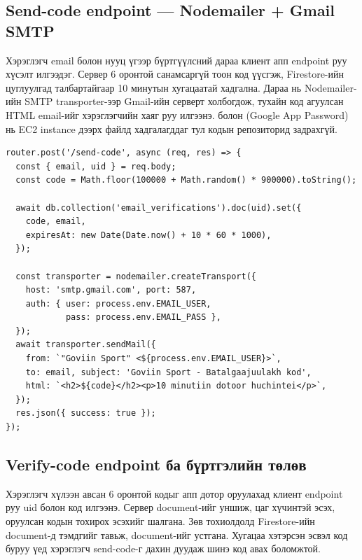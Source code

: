 \subsection*{Send-code endpoint --- Nodemailer + Gmail SMTP}

Хэрэглэгч email болон нууц үгээр бүртгүүлсний дараа клиент апп  endpoint руу хүсэлт илгээдэг. Сервер 6 оронтой санамсаргүй тоон код үүсгэж, Firestore-ийн  цуглуулгад  талбартайгаар 10 минутын хугацаатай хадгална. Дараа нь Nodemailer-ийн SMTP transporter-ээр Gmail-ийн  серверт холбогдож, тухайн код агуулсан HTML email-ийг хэрэглэгчийн хаяг руу илгээнэ.  болон  (Google App Password) нь EC2 instance дээрх  файлд хадгалагддаг тул кодын репозиторид задрахгүй.

\begin{lstlisting}[language={}, caption={routes/auth.js --- Nodemailer ашиглан баталгаажуулах код илгээх}]
router.post('/send-code', async (req, res) => {
  const { email, uid } = req.body;
  const code = Math.floor(100000 + Math.random() * 900000).toString();

  await db.collection('email_verifications').doc(uid).set({
    code, email,
    expiresAt: new Date(Date.now() + 10 * 60 * 1000),
  });

  const transporter = nodemailer.createTransport({
    host: 'smtp.gmail.com', port: 587,
    auth: { user: process.env.EMAIL_USER,
            pass: process.env.EMAIL_PASS },
  });
  await transporter.sendMail({
    from: `"Goviin Sport" <${process.env.EMAIL_USER}>`,
    to: email, subject: 'Goviin Sport - Batalgaajuulakh kod',
    html: `<h2>${code}</h2><p>10 minutiin dotoor huchintei</p>`,
  });
  res.json({ success: true });
});
\end{lstlisting}

\subsection*{Verify-code endpoint ба бүртгэлийн төлөв}

Хэрэглэгч хүлээн авсан 6 оронтой кодыг апп дотор оруулахад клиент  endpoint руу uid болон код илгээнэ. Сервер  document-ийг уншиж,  цаг хүчинтэй эсэх, оруулсан кодын тохирох эсэхийг шалгана. Зөв тохиолдолд Firestore-ийн  document-д  тэмдгийг тавьж,  document-ийг устгана. Хугацаа хэтэрсэн эсвэл код буруу үед хэрэглэгч send-code-г дахин дуудаж шинэ код авах боломжтой.


